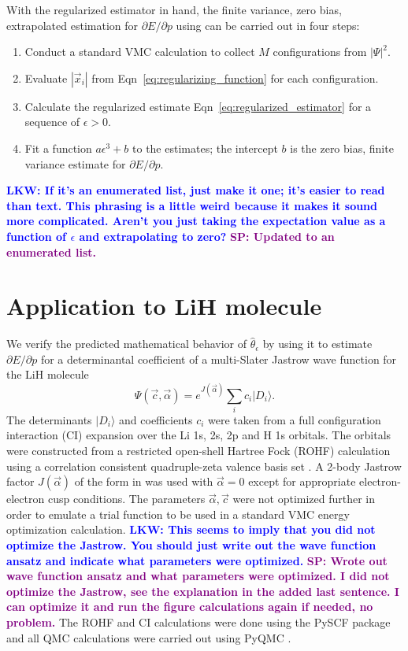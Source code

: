 \documentclass[twocolumn]{revtex4-1}
\newcommand{\lucas}[1]{\textbf{\textcolor{blue}{LKW: #1}}}
\newcommand{\shivesh}[1]{\textbf{\textcolor{purple}{SP: #1}}}
\begin{document}
With the regularized estimator in hand, the finite variance, zero bias, extrapolated estimation for $\partial E/\partial p$ using can be carried out in four steps:
\begin{enumerate}
\item Conduct a standard VMC calculation to collect $M$ configurations from $|\Psi|^2$.
\item Evaluate $|\vec{x}_i|$ from Eqn~\ref{eq:regularizing_function} for each configuration.
\item Calculate the regularized estimate Eqn~\ref{eq:regularized_estimator} for a sequence of $\epsilon > 0$.
\item Fit a function $a\epsilon^3 + b$ to the estimates; the intercept $b$ is the zero bias, finite variance estimate for $\partial E/\partial p$.
\end{enumerate}
\lucas{If it's an enumerated list, just make it one; it's easier to read than text. This phrasing is a little weird because it makes it sound more complicated. Aren't you just taking the expectation value as a function of $\epsilon$ and extrapolating to zero?} 
\shivesh{Updated to an enumerated list.}

\section{Application to LiH molecule}
We verify the predicted mathematical behavior of $\hat{\theta}_\epsilon$ by using it to estimate $\partial E/\partial p$ for a determinantal coefficient of a multi-Slater Jastrow wave function for the LiH molecule
\begin{equation}
\Psi(\vec{c}, \vec{\alpha}) = e^{J(\vec{\alpha})} \sum_{i} c_i  |D_i \rangle.
\end{equation}
The determinants $|D_i \rangle$ and coefficients $c_i$ were taken from a full configuration interaction (CI) expansion over the Li 1s, 2s, 2p and H 1s orbitals.
The orbitals were constructed from a restricted open-shell Hartree Fock (ROHF) calculation using a correlation consistent quadruple-zeta valence basis set \cite{doi:10.1063/1.456153}.
A 2-body Jastrow factor $J(\vec{\alpha})$ of the form in \cite{Wagner2009} was used with $\vec{\alpha} = 0$ except for appropriate electron-electron cusp conditions.
The parameters $\vec{\alpha}, \vec{c}$ were not optimized further in order to emulate a trial function to be used in a standard VMC energy optimization calculation.
\lucas{This seems to imply that you did not optimize the Jastrow. You should just write out the wave function ansatz and indicate what parameters were optimized.}
\shivesh{Wrote out wave function ansatz and what parameters were optimized. I did not optimize the Jastrow, see the explanation in the added last sentence. I can optimize it and run the figure calculations again if needed, no problem.}
The ROHF and CI calculations were done using the PySCF package \cite{PYSCF} and all QMC calculations were carried out using PyQMC \cite{pyqmc}.
\end{document}

